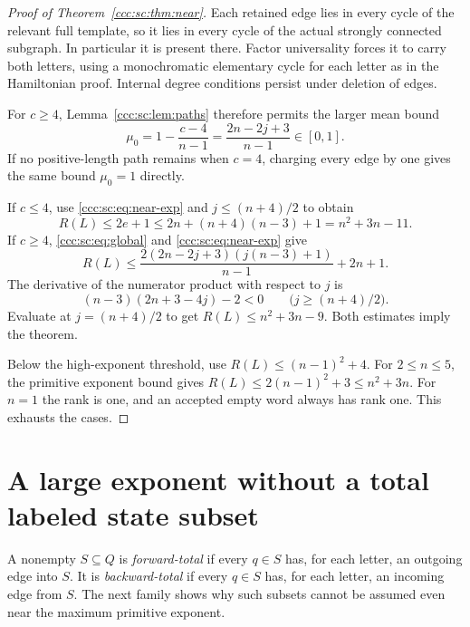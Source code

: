 \documentclass[11pt,letterpaper]{article}
\theoremstyle{definition}
\theoremstyle{remark}
\begin{document}
\begin{proof}[Proof of Theorem~\ref{ccc:sc:thm:near}]
Each retained edge lies in every cycle of the relevant full template, so it lies in every cycle of the actual strongly connected subgraph. In particular it is present there. Factor universality forces it to carry both letters, using a monochromatic elementary cycle for each letter as in the Hamiltonian proof. Internal degree conditions persist under deletion of edges.

For $c\ge4$, Lemma~\ref{ccc:sc:lem:paths} therefore permits the larger mean bound
\[
 \mu_0=1-\frac{c-4}{n-1}=\frac{2n-2j+3}{n-1}\in[0,1].
\]
If no positive-length path remains when $c=4$, charging every edge by one gives the same bound $\mu_0=1$ directly.

If $c\le4$, use \eqref{ccc:sc:eq:near-exp} and $j\le(n+4)/2$ to obtain
\[
 R(L)\le2e+1\le2n+(n+4)(n-3)+1=n^2+3n-11.
\]
If $c\ge4$, \eqref{ccc:sc:eq:global} and \eqref{ccc:sc:eq:near-exp} give
\[
 R(L)\le\frac{2(2n-2j+3)(j(n-3)+1)}{n-1}+2n+1.
\]
The derivative of the numerator product with respect to $j$ is
\[
 (n-3)(2n+3-4j)-2<0\qquad\bigl(j\ge(n+4)/2\bigr).
\]
Evaluate at $j=(n+4)/2$ to get $R(L)\le n^2+3n-9$. Both estimates imply the theorem.

Below the high-exponent threshold, use $R(L)\le(n-1)^2+4$. For $2\le n\le5$, the primitive exponent bound gives $R(L)\le2(n-1)^2+3\le n^2+3n$. For $n=1$ the rank is one, and an accepted empty word always has rank one. This exhausts the cases.
\end{proof}

\section{A large exponent without a total labeled state subset}\label{ccc:sc:sec:barrier}

A nonempty $S\subseteq Q$ is \emph{forward-total} if every $q\in S$ has, for each letter, an outgoing edge into $S$. It is \emph{backward-total} if every $q\in S$ has, for each letter, an incoming edge from $S$. The next family shows why such subsets cannot be assumed even near the maximum primitive exponent.
\end{document}
